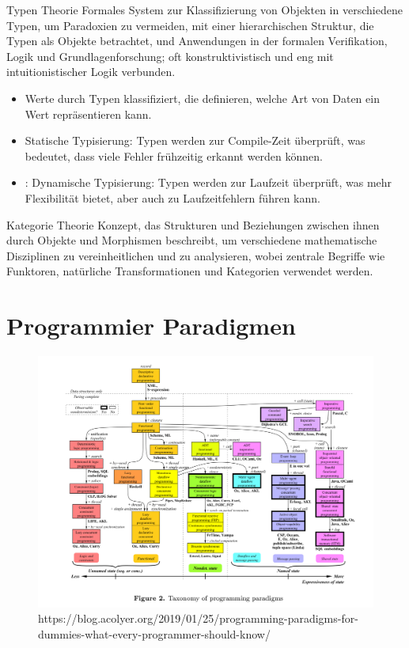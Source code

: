 \documentclass{beamer}
\begin{document}
\begin{frame}{ Typen Theorie}
 \textmd{Formales System zur Klassifizierung von Objekten in verschiedene Typen, um Paradoxien zu vermeiden, mit einer hierarchischen Struktur, die Typen als Objekte betrachtet, und Anwendungen in der formalen Verifikation, Logik und Grundlagenforschung; oft konstruktivistisch und eng mit intuitionistischer Logik verbunden.}
\begin{itemize}
\item Werte durch Typen klassifiziert, die definieren, welche Art von Daten ein Wert repräsentieren kann.
\item Statische Typisierung: Typen werden zur Compile-Zeit überprüft, was bedeutet, dass viele Fehler frühzeitig erkannt werden können.
\item: Dynamische Typisierung: Typen werden zur Laufzeit überprüft, was mehr Flexibilität bietet, aber auch zu Laufzeitfehlern führen kann. 
\end{itemize}

\end{frame}

\begin{frame}{Kategorie Theorie}
\textmd{Konzept, das Strukturen und Beziehungen zwischen ihnen durch Objekte und Morphismen beschreibt, um verschiedene mathematische Disziplinen zu vereinheitlichen und zu analysieren, wobei zentrale Begriffe wie Funktoren, natürliche Transformationen und Kategorien verwendet werden.}
	\end{frame}

\section{Programmier Paradigmen}
\begin{frame}
	\begin{figure}
	    \centering
	    \includegraphics[width=0.9\linewidth]{bilder/Programming-paradigms.png}
	    \textmd{ \tiny https://blog.acolyer.org/2019/01/25/programming-paradigms-for-dummies-what-every-programmer-should-know/}
	\end{figure}
\end{frame}
\end{document}
